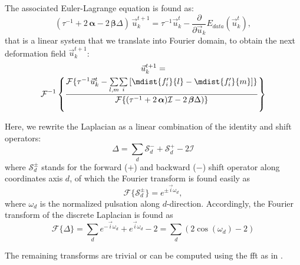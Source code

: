 The associated Euler-Lagrange equation is found as:
\begin{equation}
(\tau^{-1} +2\, \boldsymbol{\alpha} - 2\, \boldsymbol{\beta} \Delta )\, \vec{u}_k^{t+1} =
\tau^{-1} \vec{u}_k^t - \frac{\partial}{\partial \vec{u}_k} E_{data}(\vec{u}_k^t),
\end{equation}
that is a linear system that we translate into Fourier domain,
to obtain the next deformation field $\vec{u}_k^{t+1}$:
\begin{multline}
\vec{u}_k^{t+1} = \\
 \mathcal{F}^{-1} \left\lbrace
\frac{\mathcal{F}\lbrace \tau^{-1}\vec{u}_{k}^{t} - \underset{l,m}{\sum} \underset{i}{\sum}
\left[ \mdist{f_i'}{l} - \mdist{f_i'}{m}\right] \rbrace}
     {\mathcal{F}\lbrace (\tau^{-1} +2\,\boldsymbol{\alpha})\mathcal{I} - 2\,\boldsymbol{\beta} \Delta ) \rbrace}
     \right\rbrace
\end{multline}

Here, we rewrite the Laplacian as a linear combination of the identity and shift operators:
\begin{equation}
\Delta = \sum\limits_d \mathcal{S}_d^- + \mathcal{S}_d^+ - 2 \mathcal{I}
\end{equation}
where $\mathcal{S}_{d}^{\pm}$ stands for the forward ($+$) and backward ($-$) shift
operator along coordinates axis $d$, of which the Fourier transform is found easily as
\begin{equation}
\mathcal{F}\{\mathcal{S}_{d}^{\pm}\} = e^{\pm \vec{i}\omega_{d}},
\end{equation}
where $\omega_{d}$ is the normalized pulsation along $d$-direction. Accordingly, the
Fourier transform of the discrete Laplacian is found as
\begin{equation}
\mathcal{F}\{\Delta\} = \sum\limits_d e^{-\vec{i}\omega_d } + e^{\vec{i}\omega_d } - 2 = \sum\limits_d \left( 2\cos(\omega_d) - 2 \right)
\end{equation}

The remaining transforms are trivial or can be computed using the \gls{fft}
as in \citep{estellers_efficient_2011}.